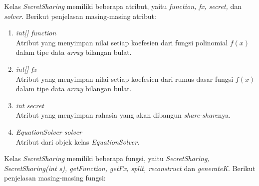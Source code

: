 Kelas \textit{SecretSharing} memiliki beberapa atribut, yaitu \textit{function, fx, secret,} dan \textit{solver}. Berikut penjelasan masing-masing atribut:

\begin{enumerate}
	\item \textit{int[] function} \\
	Atribut yang menyimpan nilai setiap koefesien dari fungsi polinomial \begin{math}f(x)\end{math} dalam tipe data \textit{array} bilangan bulat.
	\item \textit{int[] fx} \\
	Atribut yang menyimpan nilai setiap koefesien dari rumus dasar fungsi \begin{math}f(x)\end{math} dalam tipe data \textit{array} bilangan bulat.
	\item \textit{int secret} \\
	Atribut yang menyimpan rahasia yang akan dibangun \textit{share-share}nya.
	\item \textit{EquationSolver solver} \\
	Atribut dari objek kelas \textit{EquationSolver}.
\end{enumerate}

Kelas \textit{SecretSharing} memiliki beberapa fungsi, yaitu \textit{SecretSharing, SecretSharing(int s), getFunction, getFx, split, reconstruct} dan \textit{generateK}. Berikut penjelasan masing-masing fungsi:

